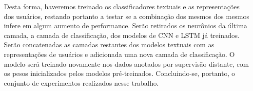 Desta forma, haveremos treinado os classificadores textuais e as representações
dos usuários, restando portanto a testar se a combinação dos mesmos dos mesmos
infere em algum aumento de performance.
Serão retirados os neurônios da última camada, a camada de classificação, dos
modelos de CNN e LSTM já treinados.
Serão concatenadas as camadas restantes dos modelos textuais com as
representações de usuários e adicionada uma nova camada de classificação.
O modelo será treinado novamente nos dados anotados por supervisão distante, com
os pesos inicializados pelos modelos pré-treinados.
Concluindo-se, portanto, o conjunto de experimentos realizados nesse trabalho.
